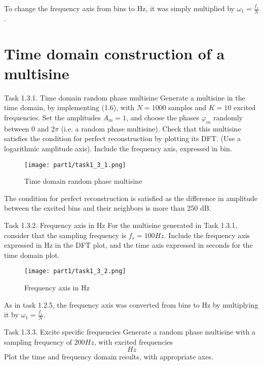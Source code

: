 To change the frequency axis from bins to Hz, it was simply multiplied by $\omega_1 = \frac{f_s}{N}$.

\section{Time domain construction of a multisine}

\begin{Task}{Task 1.3.1. Time domain random phase multisine}
    Generate a multisine in the time domain, by implementing (1.6), with $N = 1000$ samples and $K = 10$ excited frequencies. Set the amplitudes $A_m = 1$, and choose the phases $\varphi_m$ randomly between $0$ and $2\pi$ (i.e. a random phase multisine). Check that this multisine satisfies the condition for perfect reconstruction by plotting its DFT. (Use a logarithmic amplitude axis). Include the frequency axis, expressed in bin.
\end{Task}

\begin{figure}[H]
    \centering
    \texttt{[image: part1/task1\_3\_1.png]}
    \caption{Time domain random phase multisine}
\end{figure}

The condition for perfect reconstruction is satisfied as the difference in amplitude between the excited bins and their neighbors is more than 250 dB.

\begin{Task}{Task 1.3.2. Frequency axis in Hz}
    For the multisine generated in Task 1.3.1, consider that the sampling frequency is $f_s = 100 Hz$. Include the frequency axis expressed in Hz in the DFT plot, and the time axis expressed in seconds for the time domain plot.
\end{Task}

\begin{figure}[H]
    \centering
    \texttt{[image: part1/task1\_3\_2.png]}
    \caption{Frequency axis in Hz}
\end{figure}

As in task 1.2.5, the frequency axis was converted from bins to Hz by multiplying it by $\omega_1 = \frac{f_s}{N}$.

\begin{Task}{Task 1.3.3. Excite specific frequencies}
    Generate a random phase multisine with a sampling frequency of $200 Hz$, with excited frequencies
    \begin{equation*}
        [4, 8, 12, 16, 20, 24] Hz
    \end{equation*}
    Plot the time and frequency domain results, with appropriate axes.
\end{Task}

